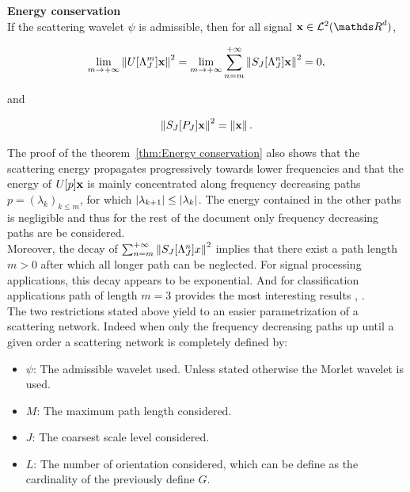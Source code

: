 \documentclass[a4paper,11pt]{report}
\begin{document}
			\begin{thm} \textbf{Energy conservation}\\ 
				If the scattering wavelet $\psi$ is admissible, then for all signal $\bfx \in \mcalL^{2}(\dsR^{d})$, %
				
				\begin{equation}
				  \lim_{m \rightarrow +\infty} \left\lVert U[\Lambda_{J}^{m}]{\bf x} \right\rVert^{2} = \lim_{m \rightarrow +\infty} \sum_{n=m}^{+\infty} \left\lVert S_{J}[\Lambda_{J}^{n}]{\bf x} \right\rVert^{2} = 0,
					\label{eq:energy conservation 1}
				\end{equation}
				
				and
				
				\begin{equation}
				  \left\lVert S_{J}[P_{J}]{\bf x} \right\rVert^{2} = \left\lVert {\bf x} \right\rVert.
				  \label{eq:energy conservation 2}
				\end{equation}
				\label{thm:Energy conservation}
			\end{thm}

			The proof of the theorem~\ref{thm:Energy conservation} also shows that the scattering energy propagates progressively towards lower frequencies and that the energy of $U[p]{\bf x}$ is mainly concentrated along frequency decreasing paths $p=(\lambda_{k})_{k\leq m}$, \ie for which $\left| \lambda_{k+1} \right| \leq \left| \lambda_{k} \right|$. The energy contained in the other paths is negligible and thus for the rest of the document only frequency decreasing paths are be considered.\\
			
			Moreover, the decay of $\sum_{n=m}^{+\infty} \left\lVert S_{J}[\Lambda_{J}^{n}]x \right\rVert^{2}$ implies that there exist a path length $m > 0$ after which all longer path can be neglected. For signal processing applications, this decay appears to be exponential. And for classification applications path of length $m = 3$ provides the most interesting results \cite{anden2011multiscale}, \cite{bruna2010classification}.\\
			
			The two restrictions stated above yield to an easier parametrization of a scattering network. Indeed when only the frequency decreasing paths up until a given order a scattering network is completely defined by:
			\begin{itemize}
				\item $\psi$: The admissible wavelet used. Unless stated otherwise the Morlet wavelet is used.
			  \item $M$: The maximum path length considered.
			  \item $J$: The coarsest scale level considered.
			  \item $L$: The number of orientation considered, which can be define as the cardinality of the previously define $G$.
			\end{itemize}
			
\end{document}
